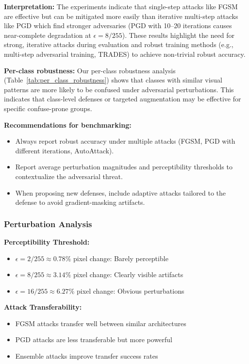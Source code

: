 \documentclass[conference]{IEEEtran}
\begin{document}
\textbf{Interpretation:} The experiments indicate that single-step attacks like FGSM are effective but can be mitigated more easily than iterative multi-step attacks like PGD which find stronger adversaries (PGD with 10--20 iterations causes near-complete degradation at $\epsilon=8/255$). These results highlight the need for strong, iterative attacks during evaluation and robust training methods (e.g., multi-step adversarial training, TRADES) to achieve non-trivial robust accuracy. 

\textbf{Per-class robustness:} Our per-class robustness analysis (Table~\ref{tab:per_class_robustness}) shows that classes with similar visual patterns are more likely to be confused under adversarial perturbations. This indicates that class-level defenses or targeted augmentation may be effective for specific confuse-prone groups.

\textbf{Recommendations for benchmarking:}
\begin{itemize}
  \item Always report robust accuracy under multiple attacks (FGSM, PGD with different iterations, AutoAttack).
  \item Report average perturbation magnitudes and perceptibility thresholds to contextualize the adversarial threat.
  \item When proposing new defenses, include adaptive attacks tailored to the defense to avoid gradient-masking artifacts.
\end{itemize}

\subsubsection{Perturbation Analysis}
\label{sec:q4_perturbation_analysis}

\textbf{Perceptibility Threshold:}
\begin{itemize}
  \item $\epsilon = 2/255 \approx 0.78\%$ pixel change: Barely perceptible
  \item $\epsilon = 8/255 \approx 3.14\%$ pixel change: Clearly visible artifacts
  \item $\epsilon = 16/255 \approx 6.27\%$ pixel change: Obvious perturbations
\end{itemize}

\textbf{Attack Transferability:}
\begin{itemize}
  \item FGSM attacks transfer well between similar architectures
  \item PGD attacks are less transferable but more powerful
  \item Ensemble attacks improve transfer success rates
\end{itemize}
\end{document}
